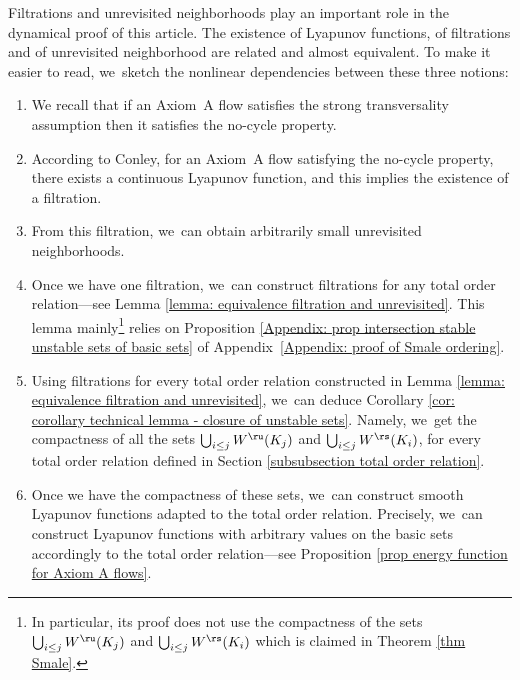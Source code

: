 Filtrations and unrevisited neighborhoods play an important role in the dynamical proof of this article. The existence of Lyapunov functions, of filtrations and of unrevisited neighborhood are related and almost equivalent. To make it easier to read, we~sketch the nonlinear dependencies between these three notions:
\begin{enumerate}
\item We recall that if an Axiom~A flow satisfies the strong transversality assumption then it satisfies the no-cycle property.
\item According to Conley, for an Axiom~A flow satisfying the no-cycle property, there exists a continuous Lyapunov function, and this implies the existence of a filtration.
\item From this filtration, we~can obtain arbitrarily small unrevisited neighborhoods.
\item Once we have one filtration, we~can construct filtrations for any total order relation---see Lemma \ref{lemma: equivalence filtration and unrevisited}. This lemma mainly\footnote{In particular, its proof does not use the compactness of the sets $ \bigcup_{i \leq j} W^\ru (K_j)$ and $ \bigcup_{i \leq j} W^\rs (K_i)$ which is claimed in Theorem \ref{thm Smale}.} relies on Proposition \ref{Appendix: prop intersection stable unstable sets of basic sets} of Appendix~\ref{Appendix: proof of Smale ordering}.
\item Using filtrations for every total order relation constructed in Lemma \ref{lemma: equivalence filtration and unrevisited}, we~can deduce Corollary \ref{cor: corollary technical lemma - closure of unstable sets}. Namely, we~get the compactness of all the sets $ \bigcup_{i \leq j} W^\ru (K_j)$ and $ \bigcup_{i \leq j} W^\rs (K_i)$, for every total order relation defined in Section \ref{subsubsection total order relation}.
\item Once we have the compactness of these sets, we~can construct smooth Lyapunov functions adapted to the total order relation. Precisely, we~can construct Lyapunov functions with arbitrary values on the basic sets accordingly to the total order relation---see Proposition \ref{prop energy function for Axiom A flows}.
\end{enumerate}

